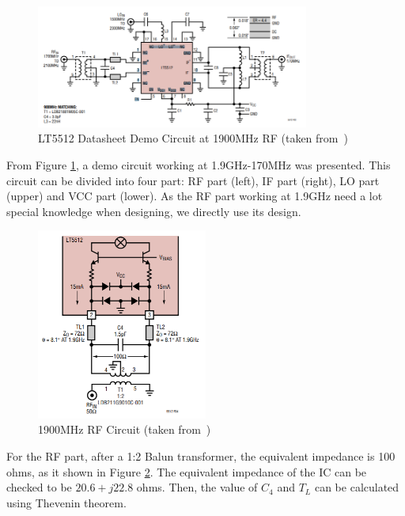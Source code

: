 \documentclass[12pt, a4paper]{report}
\begin{document}
\begin{figure}[htbp]     \begin{centering}
    \includegraphics[width=0.8\textwidth]{img/d1.png}
    \caption{\label{Fig:d1}LT5512 Datasheet Demo Circuit at 1900MHz RF (taken from~\cite{ref:LT5512_old})}
    \end{centering}
    
\end{figure}

\newpage

From Figure \ref{Fig:d1}, a demo circuit working at 1.9GHz-170MHz was presented. This circuit can be divided into four part: RF part (left), IF part (right), LO part (upper) and VCC part (lower). As the RF part working at 1.9GHz need a lot special knowledge when designing, we directly use its design.



\begin{figure}[htbp]     \begin{centering}
    \includegraphics[width=0.5\textwidth]{img/d1_rf.png}
    \caption{\label{Fig:d1_rf}1900MHz RF Circuit (taken from~\cite{ref:LT5512_old})}
    \end{centering}
    
\end{figure}

For the RF part, after a 1:2 Balun transformer, the equivalent impedance is 100 ohms, as it shown in Figure \ref{Fig:d1_rf}. The equivalent impedance of the IC can be checked to be $20.6+j22.8$ ohms. Then, the value of $C_{4}$ and $T_{L}$ can be calculated using Thevenin theorem. 
\end{document}

